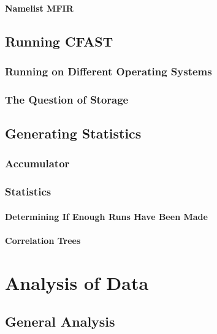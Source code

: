 \documentclass[12pt,twoside]{book}
\begin{document}
\subsubsection{Namelist MFIR}

\section{Running CFAST}

\subsection{Running on Different Operating Systems}

\subsection{The Question of Storage}

\section{Generating Statistics}

\subsection{Accumulator}

\subsection{Statistics}

\subsubsection{Determining If Enough Runs Have Been Made}

\subsubsection{Correlation Trees}

%
%

\chapter{Analysis of Data}

\section{General Analysis}
\end{document}
